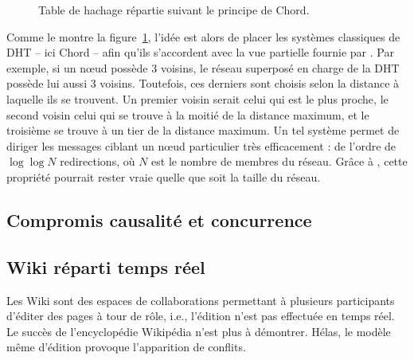\begin{figure}
  \begin{center}
    
    \caption{\label{conclu:fig:dhtexample}Table de hachage répartie suivant le
      principe de Chord.}
  \end{center}
\end{figure}

Comme le montre la figure~\ref{conclu:fig:dhtexample}, l'idée est alors de
placer les systèmes classiques de DHT -- ici Chord -- afin qu'ils s'accordent
avec la vue partielle fournie par \SPRAY. Par exemple, si un nœud \SPRAY possède
3 voisins, le réseau superposé en charge de la DHT possède lui aussi 3
voisins. Toutefois, ces derniers sont choisis selon la distance à laquelle ils
se trouvent. Un premier voisin serait celui qui est le plus proche, le second
voisin celui qui se trouve à la moitié de la distance maximum, et le troisième
se trouve à un tier de la distance maximum. Un tel système permet de diriger les
messages ciblant un nœud particulier très efficacement : de l'ordre de
$\log\log N$ redirections, où $N$ est le nombre de membres du réseau. Grâce à
\SPRAY, cette propriété pourrait rester vraie quelle que soit la taille du
réseau.

\subsection{Compromis causalité et concurrence}

\subsection{Wiki réparti temps réel}

Les Wiki sont des espaces de collaborations permettant à plusieurs participants
d'éditer des pages à tour de rôle, i.e., l'édition n'est pas effectuée en temps
réel. Le succès de l'encyclopédie Wikipédia n'est plus à démontrer. Hélas, le
modèle même d'édition provoque l'apparition de conflits.


